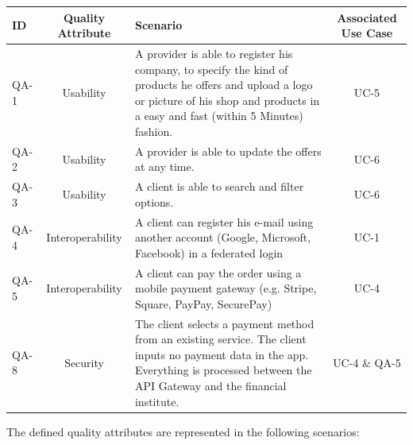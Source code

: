 \begin{table}[H]
    \begin{tabularx}{\textwidth}{lcXc}
        \toprule
        ID & Quality Attribute & Scenario & Associated Use Case  \\
        \midrule
        QA-1 & Usability & A \gls{provider} is able to register his company, to specify the kind of products he offers 
        and upload a logo or picture of his shop and products in a easy and fast (within 5 Minutes) fashion. & UC-5 \\
        QA-2 & Usability & A \gls{provider} is able to update the offers at any time. &  UC-6 \\
        QA-3 & Usability & A \gls{client} is able to search and filter options. &  UC-6 \\
        QA-4 & Interoperability & A \gls{client} can register his e-mail using another account (Google, Microsoft, Facebook)
        in a \gls{federated login} & UC-1 \\
        QA-5 & Interoperability & A \gls{client} can pay the order using a \gls{mobile payment gateway} (e.g. Stripe, Square, PayPay, 
        SecurePay) & UC-4 \\
        QA-8 & Security & The \gls{client} selects a payment method from an existing service. The client inputs no payment data 
        in the app. Everything is processed between the \gls{API Gateway} and the financial institute. & UC-4 \& QA-5 \\
        \bottomrule
    \end{tabularx}
\end{table}

\newpage
The defined quality attributes are represented in the following scenarios:


